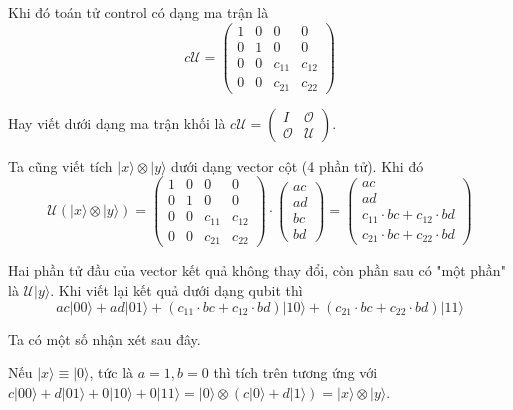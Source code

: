 Khi đó toán tử control có dạng ma trận là
\begin{equation*}
    c \mathcal{U} = \begin{pmatrix} 1 & 0 & 0 & 0 \\ 0 & 1 & 0 & 0 \\ 0 & 0 & c_{11} & c_{12} \\ 0 & 0 & c_{21} & c_{22} \end{pmatrix}
\end{equation*}

Hay viết dưới dạng ma trận khối là $c \mathcal{U} = \begin{pmatrix} I & \mathcal{O} \\ \mathcal{O} & \mathcal{U} \end{pmatrix}$.

Ta cũng viết tích $\lvert x \rangle \otimes \lvert y \rangle$ dưới dạng vector cột (4 phần tử). Khi đó
\begin{equation*}
    \mathcal{U} (\lvert x \rangle \otimes \lvert y \rangle) = \begin{pmatrix} 1 & 0 & 0 & 0 \\ 0 & 1 & 0 & 0 \\ 0 & 0 & c_{11} & c_{12} \\ 0 & 0 & c_{21} & c_{22} \end{pmatrix} \cdot \begin{pmatrix} ac \\ ad \\ bc \\ bd \end{pmatrix} = \begin{pmatrix} ac \\ ad \\ c_{11} \cdot bc + c_{12} \cdot bd \\ c_{21} \cdot bc + c_{22} \cdot bd \end{pmatrix}
\end{equation*}

Hai phần tử đầu của vector kết quả không thay đổi, còn phần sau có "một phần" là $\mathcal{U} \lvert y \rangle$. Khi viết lại kết quả dưới dạng qubit thì
\begin{equation*}
    ac \lvert 00 \rangle + ad \lvert 01 \rangle + (c_{11} \cdot bc + c_{12} \cdot bd) \lvert 10 \rangle + (c_{21} \cdot bc + c_{22} \cdot bd) \lvert 11 \rangle
\end{equation*}

Ta có một số nhận xét sau đây.

Nếu $\lvert x \rangle \equiv \lvert 0 \rangle$, tức là $a = 1, b = 0$ thì tích trên tương ứng với $c \lvert 00 \rangle + d \lvert 01 \rangle + 0 \lvert 10 \rangle + 0 \lvert 11 \rangle = \lvert 0 \rangle \otimes (c \lvert 0 \rangle + d \lvert 1 \rangle) = \lvert x \rangle \otimes \lvert y \rangle$.

